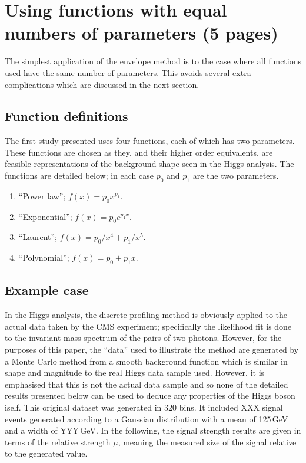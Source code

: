 \section{Using functions with equal numbers of parameters (5 pages)}
\label{sec:functions}

The simplest application of the envelope method is to the case where all
functions used have the same number of parameters. This avoids several extra
complications which are discussed in the next section.

\subsection{Function definitions}
\label{sec:functions:function}

The first study presented uses four functions, each of which has two parameters.
These functions are chosen as they, and their higher order equivalents,
are feasible representations of the background shape seen in the Higgs
analysis. The functions are detailed below; in each case $p_0$ and $p_1$ are
the two parameters.
\begin{enumerate}
\item
``Power law''; $f(x) = p_0 x^{p_1}$.
\item
``Exponential''; $f(x) = p_0 e^{p_1x}$.
\item
``Laurent''; $f(x) = p_0/x^4 + p_1/x^5$.
\item
``Polynomial''; $f(x) = p_0 + p_1 x$.
\end{enumerate}


\subsection{Example case}
\label{sec:functions:example}

In the Higgs analysis, the discrete profiling method is obviously applied to
the actual data taken by the CMS experiment; specifically the likelihood fit
is done to the invariant mass spectrum of the pairs of two photons.
However, for the purposes of this
paper, the ``data'' used to illustrate the method are generated by a Monte Carlo
method from a smooth background
function which is similar in shape and magnitude to the
real Higgs data sample used. However, it is emphasised that this is not the 
actual data sample and so 
none of the detailed results presented below can be used to deduce any
properties of the Higgs boson iself.
This original dataset was generated in 320 bins. It included XXX signal events
generated according to a Gaussian distribution with a mean of 125\,GeV and a 
width of YYY\,GeV. In the following, the signal strength results are given in
terms of the relative strength $\mu$, 
meaning the measured size of the signal relative
to the generated value.

